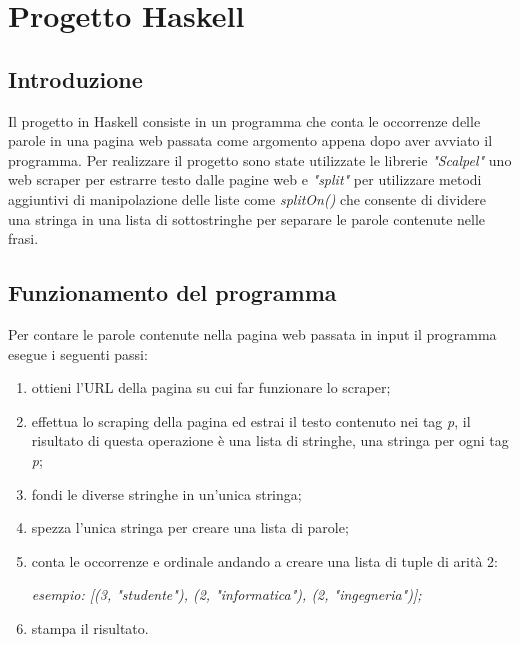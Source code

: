 \documentclass[a4paper, 11pt]{article}
\begin{document}
\section{Progetto Haskell}
\subsection{Introduzione}
Il progetto in Haskell consiste in un programma che conta le occorrenze delle parole in una pagina web passata come argomento appena dopo aver avviato il programma.
Per realizzare il progetto sono state utilizzate le librerie \textit{"Scalpel"} uno web scraper per estrarre testo dalle pagine web e \textit{"split"} per utilizzare metodi aggiuntivi di manipolazione delle liste come \textit{splitOn()} che consente di dividere una stringa in una lista di sottostringhe per separare le parole contenute nelle frasi.

\subsection{Funzionamento del programma}
Per contare le parole contenute nella pagina web passata in input il programma esegue i seguenti passi:
\begin{enumerate}
\item ottieni l'URL della pagina su cui far funzionare lo scraper;
\item effettua lo scraping della pagina ed estrai il testo contenuto nei tag \textit{p}, il risultato di questa operazione è una lista di stringhe, una stringa per ogni tag \textit{p};
\item fondi le diverse stringhe in un'unica stringa;
\item spezza l'unica stringa per creare una lista di parole;
\item conta le occorrenze e ordinale andando a creare una lista di tuple di arità 2:

\textit{esempio: [(3, "studente"), (2, "informatica"), (2, "ingegneria")];}
\item stampa il risultato.

\end{enumerate}
\end{document}

